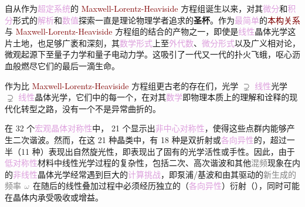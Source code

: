 自从作为\textcolor{Plum}{超定系统}的 \textcolor{Maroon}{Maxwell-Lorentz-Heaviside} 方程组诞生以来，对其\textcolor{Plum}{微分}和\textcolor{Plum}{积分}形式的\textcolor{Plum}{解析}和\textcolor{Plum}{数值}探索一直是\textcolor{NavyBlue}{理论物理学者}追求的\textbf{圣杯}\cite{olyslagerElectromagneticsExoticMedia2002}。作为\textcolor{Plum}{最简单}的\textcolor{Maroon}{本构关系}与 \textcolor{Maroon}{Maxwell-Lorentz-Heaviside} 方程组的结合的产物之一，即使是\textcolor{Plum}{线性}\textcolor{PineGreen}{晶体光学}这片土地，也足够广袤和深刻，其\textcolor{Plum}{数学形式}上至\textcolor{Plum}{外代数}、\textcolor{Plum}{微分形式}以及\textcolor{NavyBlue}{广义相对论}\cite{yakovNonbirefringenceConditionsSpacetime2005,hehlSpacetimeMetricLocal2006,frankelGeometryPhysicsIntroduction2011,dahlNondissipativeElectromagneticMedium2013,ivezicManifestlyCovariantAharonovbohm2015,hehlAxionDilatonMetric2016,favaroRecentAdvancesClassical2012}，\textcolor{NavyBlue}{微观起源}下至\textcolor{NavyBlue}{量子力学}\cite{nelsonMechanismsDispersionCrystalline1989,nelsonDerivingTransmissionReflection1995,nelsonLagrangianTreatmentMagnetic1994,nelsonOpticallyActiveSurface2000}和\textcolor{NavyBlue}{量子电动力学}\cite{eimerlQuantumElectrodynamicsOptical1988}。这吸引了一代又一代的扑火飞蛾，呕心沥血般燃尽它们的最后一滴生命。

作为比 \textcolor{Maroon}{Maxwell-Lorentz-Heaviside} 方程组更古老的存在们，光学 $\supsetneq$ \textcolor{Plum}{线性}\textcolor{NavyBlue}{光学} $\supsetneq$ \textcolor{Plum}{线性}\textcolor{PineGreen}{晶体光学}，它们中的每一个，在对其\textcolor{Plum}{数学}即\textcolor{NavyBlue}{物理本质}上的理解和诠释的现代化转型之路，没有一个不是异常曲折的。


在 32 个\textcolor{Plum}{宏观晶体对称性}中， 21 个显示出\textcolor{Plum}{非中心对称性}，使得这些\textcolor{NavyBlue}{点群}内能够产生二次谐波。然而，在这 21 种\textcolor{NavyBlue}{晶类}中，有 18 种是\textcolor{NavyBlue}{双折射}或\textcolor{Plum}{各向异性}的，超过一半（11 种）表现出自然\textcolor{NavyBlue}{旋光}性，即表现出了固有的\textcolor{NavyBlue}{光学活性}或\textcolor{NavyBlue}{手性}\cite{ossikovskiConstitutiveRelationsOptically2021}。因此，由于\textcolor{Plum}{低对称性}材料中\textcolor{PineGreen}{线性光学}过程的复杂性，包括二次、高次谐波和其他\textcolor{gray}{混频}现象在内的\textcolor{Plum}{非线性}\textcolor{PineGreen}{晶体光学}经常遇到巨大的\textcolor{Plum}{计算挑战}\cite{robertsSimplifiedCharacterizationUniaxial1992,dmitrievEffectiveNonlinearityCoefficients1993,diesperovEffectiveNonlinearCoefficient1997}，即\textcolor{NavyBlue}{泵浦}/\textcolor{PineGreen}{基波}和由其驱动的\textcolor{gray}{新生成的频率} $\mathcolor{gray}{\omega}$ 在随后的\textcolor{PineGreen}{线性叠加}过程中必须经历独立的（\textcolor{Plum}{各向异性}）衍射（），同时可能在晶体内承受\textcolor{NavyBlue}{吸收}或\textcolor{NavyBlue}{增益}\cite{shengNonlinearopticalCalculationsUsing1980,grundmannOpticallyAnisotropicMedia2017}。

